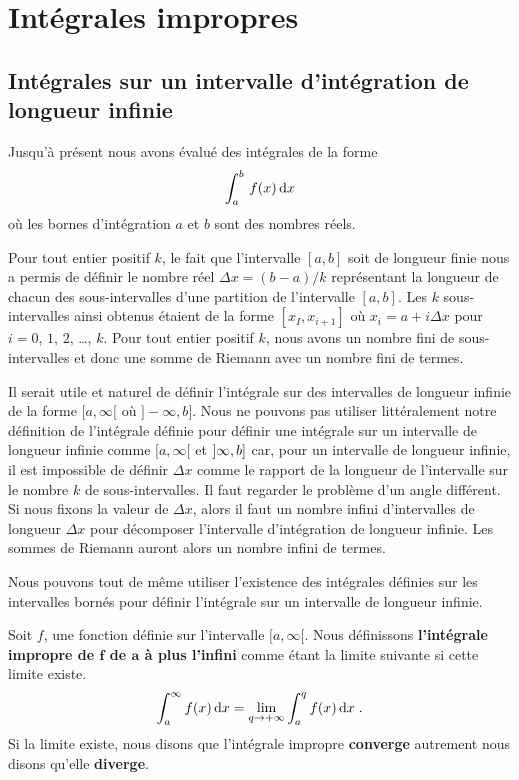 {

\section{Intégrales impropres}

\subsection{Intégrales sur un intervalle d'intégration de longueur
infinie}

Jusqu'à présent nous avons évalué des intégrales de la forme
\[
\int_a^b \, f(x) \,\mathrm{d}x
\]
où les bornes d'intégration $a$ et $b$ sont des nombres réels.

Pour tout entier positif $k$, le fait que l'intervalle $[a,b]$ soit de
longueur finie nous a permis de définir le nombre réel
$\Delta x = (b-a)/k$ représentant la longueur de chacun des
sous-intervalles d'une partition de l'intervalle $[a,b]$.  Les $k$
sous-intervalles ainsi obtenus étaient de la forme $[x_I, x_{i+1}]$ où
$x_i = a +i \Delta x$ pour $i=0$, $1$, $2$, \ldots, $k$.  Pour tout
entier positif $k$, nous avons un nombre fini de sous-intervalles et donc
une somme de Riemann avec un nombre fini de termes.

Il serait utile et naturel de définir l'intégrale sur des intervalles
de longueur infinie de la forme $[a,\infty[$ où $]-\infty, b]$.  Nous ne
pouvons pas utiliser littéralement notre définition de l'intégrale
définie pour définir une intégrale sur un intervalle de longueur
infinie comme $[a,\infty[$ et $]\-\infty, b]$ car, pour un intervalle
de longueur infinie, il est impossible de définir $\Delta x$ comme le
rapport de la longueur de l'intervalle sur le nombre $k$ de
sous-intervalles.  Il faut regarder le problème d'un angle
différent. Si nous fixons la valeur de $\Delta x$, alors il faut un nombre
infini d'intervalles de longueur $\Delta x$ pour décomposer
l'intervalle d'intégration de longueur infinie.  Les sommes de Riemann
auront alors un nombre infini de termes.

Nous pouvons tout de même utiliser l'existence des intégrales définies sur
les intervalles bornés pour définir l'intégrale sur un intervalle de
longueur infinie.

\begin{focus}{\dfn}
Soit $f$, une fonction définie sur l'intervalle $[a,\infty[$. Nous
définissons {\bfseries l'intégrale impropre de $\mathbf f$ de $\mathbf a$
à plus l'infini} comme étant la limite suivante si cette limite
existe.
\[
\int_a^\infty f(x) \,\mathrm{d}x = \lim_{q\rightarrow +\infty} \int_a^q f(x)\,\mathrm{d}x \; .
\]
Si la limite existe, nous disons que l'intégrale impropre
{\bfseries converge} autrement nous disons qu'elle {\bfseries diverge}.


\end{focus}}
